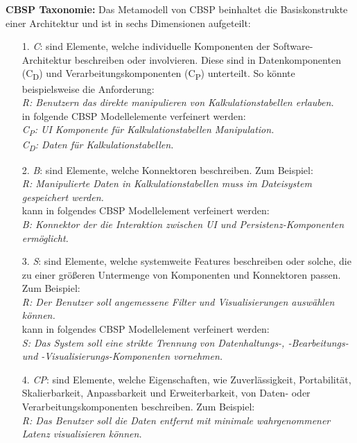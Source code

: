 \textbf{CBSP Taxonomie:}
Das Metamodell von CBSP beinhaltet die Basiskonstrukte einer Architektur und ist in sechs Dimensionen aufgeteilt: \\

\begin{itemize}
\item[1.] \textit{C}: sind Elemente, welche individuelle Komponenten der Software-Architektur beschreiben oder involvieren. Diese sind in Datenkomponenten (C\textsubscript{D}) und Verarbeitungskomponenten (C\textsubscript{P}) unterteilt. So k\"onnte beispielsweise die Anforderung: \\
	\textit{R: Benutzern das direkte manipulieren von Kalkulationstabellen erlauben.} \\
	in folgende CBSP Modellelemente verfeinert werden: \\
	\textit{C\textsubscript{P}: UI Komponente f\"ur Kalkulationstabellen Manipulation.} \\
	\textit{C\textsubscript{D}: Daten f\"ur Kalkulationstabellen.}  \cite{Gru01}
\item[2.] \textit{B}: sind Elemente, welche Konnektoren beschreiben. Zum Beispiel: \\
	\textit{R: Manipulierte Daten in Kalkulationstabellen muss im Dateisystem gespeichert werden.} \\
	kann in folgendes CBSP Modellelement verfeinert werden: \\
	\textit{B: Konnektor der die Interaktion zwischen UI und Persistenz-Komponenten erm\"oglicht.} \cite{Gru01}
\item[3.] \textit{S}: sind Elemente, welche systemweite Features beschreiben oder solche, die zu einer gr\"o\ss{}eren Untermenge von Komponenten und Konnektoren passen. Zum Beispiel: \\
	\textit{R: Der Benutzer soll angemessene Filter und Visualisierungen ausw\"ahlen k\"onnen.} \\
	kann in folgendes CBSP Modellelement verfeinert werden: \\
	\textit{S: Das System soll eine strikte Trennung von Datenhaltungs-, -Bearbeitungs- und -Visualisierungs-Komponenten vornehmen.} \cite{Gru01}
\item[4.] \textit{CP}: sind Elemente, welche Eigenschaften, wie Zuverl\"assigkeit, Portabilit\"at, Skalierbarkeit, Anpassbarkeit und Erweiterbarkeit, von Daten- oder Verarbeitungskomponenten beschreiben. Zum Beispiel: \\
	\textit{R: Das Benutzer soll die Daten entfernt mit minimale wahrgenommener Latenz visualisieren k\"onnen.} \\

\end{itemize}

